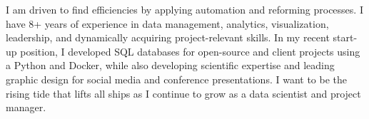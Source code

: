
\begin{cvparagraph}
I am driven to find efficiencies by applying automation and reforming processes. I have
8+ years of experience in data management, analytics, visualization, leadership,
and dynamically acquiring project-relevant skills. In my recent start-up position, I
developed SQL databases for open-source and client projects using a Python and Docker,
while also developing scientific expertise and leading graphic design for social media
and conference presentations. I want to be the rising tide that lifts all ships as I
continue to grow as a data scientist and project manager.
\end{cvparagraph}

